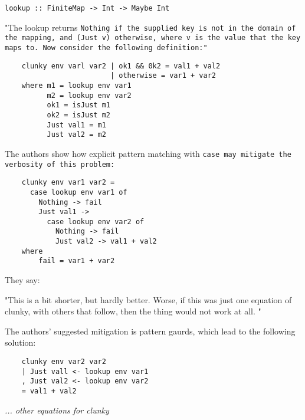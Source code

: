 \documentclass[manuscript,screen,review, 12pt]{acmart}
\begin{document}
\begin{center}
\tt{lookup :: FiniteMap -> Int -> Maybe Int}
\end{center}

"The lookup returns \tt{Nothing} if the supplied key is not in the domain of the
mapping, and (\tt{Just v}) otherwise, where v is the value that the key maps to.
Now consider the following definition:"

\begin{verbatim}
    clunky env varl var2 | ok1 && 0k2 = val1 + val2 
                         | otherwise = var1 + var2 
    where m1 = lookup env var1 
          m2 = lookup env var2
          ok1 = isJust m1 
          ok2 = isJust m2 
          Just val1 = m1 
          Just val2 = m2    
\end{verbatim}


The authors show how explicit pattern matching with \tt{case} may mitigate the
verbosity of this problem:

\begin{verbatim}
    clunky env var1 var2 = 
      case lookup env var1 of 
        Nothing -> fail 
        Just val1 -> 
          case lookup env var2 of 
            Nothing -> fail 
            Just val2 -> val1 + val2
    where 
        fail = var1 + var2
\end{verbatim}

They say: 

"This is a bit shorter, but hardly better. Worse, if this was just one equation
of clunky, with others that follow, then the thing would not work at all. " 

The authors' suggested mitigation is pattern gaurds, which lead to the following
solution: 
\begin{center}
\begin{verbatim}
    clunky env var2 var2    
    | Just vall <- lookup env var1
    , Just val2 <- lookup env var2
    = val1 + val2
\end{verbatim}
\it{... other equations for clunky}
\end{center}    
\end{document}
